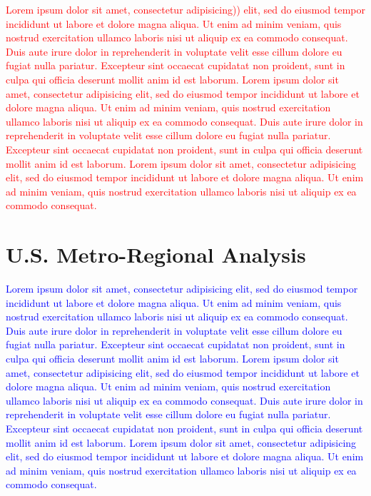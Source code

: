 \documentclass{bioinfo}
\newcommand{\col}[2][red]{\textcolor{#1}{#2}}
\begin{document}
\begin{methods}
\col[red]{Lorem ipsum dolor sit amet, consectetur adipisicing)) elit, sed do
eiusmod tempor incididunt ut labore et dolore magna aliqua. Ut enim ad
minim veniam, quis nostrud exercitation ullamco laboris nisi ut
aliquip ex ea commodo consequat. Duis aute irure dolor in
reprehenderit in voluptate velit esse cillum dolore eu fugiat nulla
pariatur. Excepteur sint occaecat cupidatat non proident, sunt in
culpa qui officia deserunt mollit anim id est laborum. Lorem ipsum
dolor sit amet, consectetur adipisicing elit, sed do eiusmod tempor
incididunt ut labore et dolore magna aliqua. Ut enim ad minim veniam,
quis nostrud exercitation ullamco laboris nisi ut aliquip ex ea
commodo consequat. Duis aute irure dolor in reprehenderit in voluptate
velit esse cillum dolore eu fugiat nulla pariatur. Excepteur sint
occaecat cupidatat non proident, sunt in culpa qui officia deserunt
mollit anim id est laborum. Lorem ipsum dolor sit amet, consectetur
adipisicing elit, sed do eiusmod tempor incididunt ut labore et dolore
magna aliqua. Ut enim ad minim veniam, quis nostrud exercitation
ullamco laboris nisi ut aliquip ex ea commodo consequat.}


\end{methods}

\section{U.S. Metro-Regional Analysis}
\col[blue]{Lorem ipsum dolor sit amet, consectetur adipisicing elit, sed do
eiusmod tempor incididunt ut labore et dolore magna aliqua. Ut enim ad
minim veniam, quis nostrud exercitation ullamco laboris nisi ut
aliquip ex ea commodo consequat. Duis aute irure dolor in
reprehenderit in voluptate velit esse cillum dolore eu fugiat nulla
pariatur. Excepteur sint occaecat cupidatat non proident, sunt in
culpa qui officia deserunt mollit anim id est laborum. Lorem ipsum
dolor sit amet, consectetur adipisicing elit, sed do eiusmod tempor
incididunt ut labore et dolore magna aliqua. Ut enim ad minim veniam,
quis nostrud exercitation ullamco laboris nisi ut aliquip ex ea
commodo consequat. Duis aute irure dolor in reprehenderit in voluptate
velit esse cillum dolore eu fugiat nulla pariatur. Excepteur sint
occaecat cupidatat non proident, sunt in culpa qui officia deserunt
mollit anim id est laborum. Lorem ipsum dolor sit amet, consectetur
adipisicing elit, sed do eiusmod tempor incididunt ut labore et dolore
magna aliqua. Ut enim ad minim veniam, quis nostrud exercitation
ullamco laboris nisi ut aliquip ex ea commodo consequat.}
\end{document}
